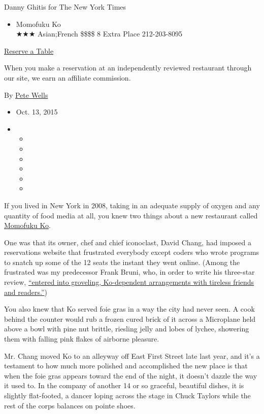 Danny Ghitis for The New York Times

\begin{itemize}
\tightlist
\item
  Momofuku Ko\\
  ★★★ Asian;French \$\$\$\$ 8 Extra Place 212-203-8095
\end{itemize}

\href{https://reservations.momofuku.com/restaurants/4/reserve}{Reserve a
Table}

When you make a reservation at an independently reviewed restaurant
through our site, we earn an affiliate commission.

By \href{http://www.nytimes3xbfgragh.onion/by/pete-wells}{Pete Wells}

\begin{itemize}
\item
  Oct. 13, 2015
\item
  \begin{itemize}
  \item
  \item
  \item
  \item
  \item
  \item
  \end{itemize}
\end{itemize}

If you lived in New York in 2008, taking in an adequate supply of oxygen
and any quantity of food media at all, you knew two things about a new
restaurant called \href{http://momofuku.com/new-york/ko/}{Momofuku Ko}.

One was that its owner, chef and chief iconoclast, David Chang, had
imposed a reservations website that frustrated everybody except coders
who wrote programs to snatch up some of the 12 seats the instant they
went online. (Among the frustrated was my predecessor Frank Bruni, who,
in order to write his three-star review,
\href{http://www.nytimes3xbfgragh.onion/2008/05/07/dining/reviews/07rest.html?pagewanted=all\&_r=0}{``entered
into groveling, Ko-dependent arrangements with tireless friends and
readers.''})

You also knew that Ko served foie gras in a way the city had never seen.
A cook behind the counter would rub a frozen cured brick of it across a
Microplane held above a bowl with pine nut brittle, riesling jelly and
lobes of lychee, showering them with falling pink flakes of airborne
pleasure.

Mr. Chang moved Ko to an alleyway off East First Street late last year,
and it's a testament to how much more polished and accomplished the new
place is that when the foie gras appears toward the end of the night, it
doesn't dazzle the way it used to. In the company of another 14 or so
graceful, beautiful dishes, it is slightly flat-footed, a dancer loping
across the stage in Chuck Taylors while the rest of the corps balances
on pointe shoes.

